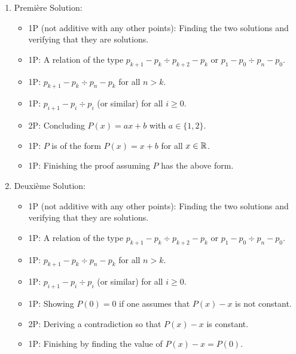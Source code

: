 \begin{enumerate}

\item Première Solution:
\begin{itemize}

    \item 1P (not additive with any other points): Finding the two solutions and verifying that they are solutions.
    \item 1P: A relation of the type $p_{k+1}-p_k\div p_{k+2}-p_k$ or $p_1-p_0\div p_n-p_0$.
    \item 1P: $p_{k+1}-p_k\div p_n-p_k$ for all $n>k$.
    \item 1P: $p_{i+1}-p_i\div p_i$ (or similar) for all $i\geq 0$.
    \item 2P: Concluding $P(x)=ax+b$ with $a\in\{1,2\}$.
    \item 1P: $P$ is of the form $P(x)=x+b$ for all $x\in \mathbb{R}$.
    \item 1P: Finishing the proof assuming $P$ has the above form.

\end{itemize}

\item Deuxième Solution:
\begin{itemize}
    \item 1P (not additive with any other points): Finding the two solutions and verifying that they are solutions.
    \item 1P: A relation of the type $p_{k+1}-p_k\div p_{k+2}-p_k$ or $p_1-p_0\div p_n-p_0$.
    \item 1P: $p_{k+1}-p_k\div p_n-p_k$ for all $n>k$.
    \item 1P: $p_{i+1}-p_i\div p_i$ (or similar) for all $i\geq 0$.
    \item 1P: Showing $P(0)=0$ if one assumes that $P(x)-x$ is not constant.
    \item 2P: Deriving a contradiction so that $P(x)-x$ is constant.
    \item 1P: Finishing by finding the value of $P(x)-x=P(0)$.
\end{itemize}

\end{enumerate}